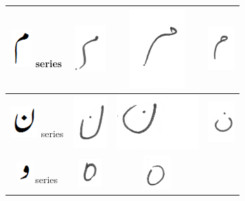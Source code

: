 \documentclass[a4paper,conference]{IEEEtran}
\begin{document}
\begin{table}[h]
\begin{tabular}{@{}cccc@{}}
\hline
\includegraphics[scale=0.15]{meem_orig} series & \includegraphics[scale=0.15]{207} & 
\includegraphics[scale=0.10]{208} & \includegraphics[scale=0.15]{209} \\
\hline
\includegraphics[scale=0.15]{noon_orig} series & \includegraphics[scale=0.15]{210} & \includegraphics[scale=0.15]{211} &
\includegraphics[scale=0.15]{212} \\
\hline
\includegraphics[scale=0.15]{wao_orig} series & \includegraphics[scale=0.15]{213} & \includegraphics[scale=0.15]{214} &

\end{tabular}
\end{table}
\end{document}
